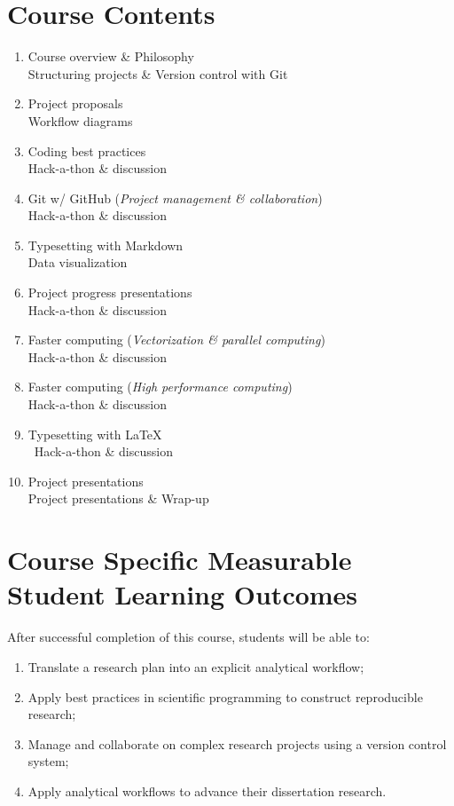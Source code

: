 \documentclass[10pt]{article}
\begin{document}
\section*{Course Contents}
\begin{enumerate}[label=\bfseries Week \arabic*:,leftmargin=*,labelindent=3em]
	\itemsep0em
	\item Course overview \& Philosophy\\
	Structuring projects \& Version control with Git
	\item Project proposals\\
	Workflow diagrams
	\item Coding best practices \\
	Hack-a-thon \& discussion
	\item Git w/ GitHub (\emph{Project management \& collaboration})\\
	Hack-a-thon \& discussion
	\item Typesetting with Markdown\\
	Data visualization
	\item Project progress presentations\\
	Hack-a-thon \& discussion
	\item Faster computing (\emph{Vectorization \& parallel computing})\\
	Hack-a-thon \& discussion
	\item Faster computing (\emph{High performance computing})\\
	Hack-a-thon \& discussion
	\item Typesetting with \LaTeX\\\
	Hack-a-thon \& discussion
	\item Project presentations\\
	Project presentations \& Wrap-up
\end{enumerate}

\section*{Course Specific Measurable Student Learning Outcomes}
After successful completion of this course, students will be able to:
\begin{enumerate}[leftmargin=2cm]
	\itemsep0em
	\item Translate a research plan into an explicit analytical workflow;
	\item Apply best practices in scientific programming to construct reproducible research;
	\item Manage and collaborate on complex research projects using a version control system;
	\item Apply analytical workflows to advance their dissertation research.
\end{enumerate}
\end{document}
